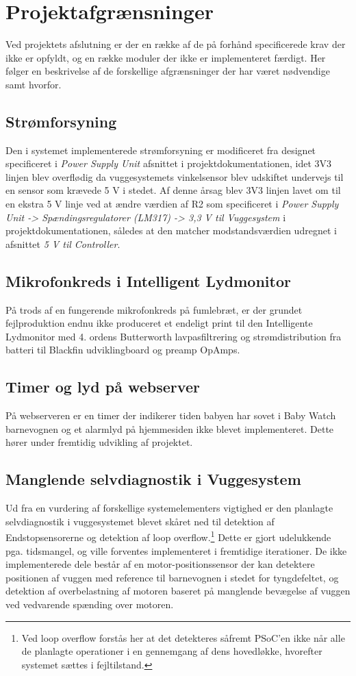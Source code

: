 %
\chapter{Projektafgrænsninger}
\label{projektafgraensninger}
Ved projektets afslutning er der en række af de på forhånd specificerede krav der ikke er opfyldt, og en række moduler der ikke er implementeret færdigt. Her følger en beskrivelse af de forskellige afgrænsninger der har været nødvendige samt hvorfor. 

\section{Strømforsyning}
Den i systemet implementerede strømforsyning er modificeret fra designet specificeret i \textit{Power Supply Unit} afsnittet i projektdokumentationen, idet 3V3 linjen blev overflødig da vuggesystemets vinkelsensor blev udskiftet undervejs til en sensor som krævede 5 V i stedet. Af denne årsag blev 3V3 linjen lavet om til en ekstra 5 V linje ved at ændre værdien af R2 som specificeret i \textit{Power Supply Unit -> Spændingsregulatorer (LM317) -> 3,3 V til Vuggesystem} i projektdokumentationen, således at den matcher modstandsværdien udregnet i afsnittet \textit{5 V til Controller}.

\section{Mikrofonkreds i Intelligent Lydmonitor}
På trods af en fungerende mikrofonkreds på fumlebræt, er der grundet fejlproduktion endnu ikke produceret et endeligt print til den Intelligente Lydmonitor med 4. ordens Butterworth lavpasfiltrering og strømdistribution fra batteri til Blackfin udviklingboard \citep{EzKit} og preamp OpAmps.

\section{Timer og lyd på webserver}
På webserveren er en timer der indikerer tiden babyen har sovet i Baby Watch barnevognen og et alarmlyd på hjemmesiden ikke blevet implementeret. Dette hører under fremtidig udvikling af projektet. 

\section{Manglende selvdiagnostik i Vuggesystem}
Ud fra en vurdering af forskellige systemelementers vigtighed er den planlagte selvdiagnostik i vuggesystemet blevet skåret ned til detektion af Endstopsensorerne og detektion af loop overflow.\footnote{Ved loop overflow forstås her at det detekteres såfremt PSoC'en \citep{website:Cypress} ikke når alle de planlagte operationer i en gennemgang af dens hovedløkke, hvorefter systemet sættes i fejltilstand.} Dette er gjort udelukkende pga. tidsmangel, og ville forventes implementeret i fremtidige iterationer. De ikke implementerede dele består af en motor-positionssensor der kan detektere positionen af vuggen med reference til barnevognen i stedet for tyngdefeltet, og detektion af overbelastning af motoren baseret på manglende bevægelse af vuggen ved vedvarende spænding over motoren. 


